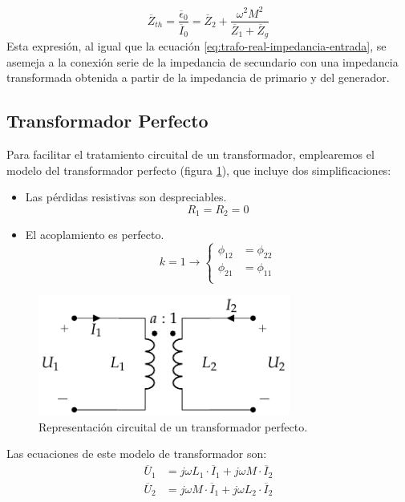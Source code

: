 \begin{equation}
  \label{eq:trafo-real-impedancia-thevenin}
  \boxed{\overline{Z}_{th} = \frac{\overline{\epsilon}_0}{\overline{I}_0} = \overline{Z}_2 + \frac{\omega^2 M^2}{\overline{Z}_1 + \overline{Z}_g}}
\end{equation}
Esta expresión, al igual que la ecuación
\ref{eq:trafo-real-impedancia-entrada}, se asemeja a la conexión serie
de la impedancia de secundario con una impedancia transformada
obtenida a partir de la impedancia de primario y del generador.

\subsection{Transformador Perfecto}
\label{sec:trafo-perfecto}

Para facilitar el tratamiento circuital de un transformador, emplearemos el modelo del transformador perfecto (figura \ref{fig:trafo-perfecto}), que incluye dos simplificaciones:
\begin{itemize}
\item Las pérdidas resistivas son despreciables.
  \[
    R_1 = R_2 = 0
  \]
\item El acoplamiento es perfecto.
  \[
    k = 1 \rightarrow \left\{
      \begin{array}{cc}
        \phi_{12} &= \phi_{22}\\
        \phi_{21} &= \phi_{11}\\
      \end{array} \right.
  \]
\end{itemize}

\begin{figure}
  \centering
  \includegraphics[height=4cm]{../figs/Trafo_Perfecto.pdf}
  \caption{Representación circuital de un transformador perfecto.}
  \label{fig:trafo-perfecto}
\end{figure}

Las ecuaciones de este modelo de transformador son:
\begin{align*}
  \overline{U}_1 &= j \omega L_1 \cdot \overline{I}_1 + j \omega M \cdot \overline{I}_2\\
  \overline{U}_2 &= j \omega M \cdot \overline{I}_1 + j \omega L_2 \cdot \overline{I}_2
\end{align*}

